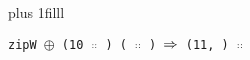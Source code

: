 \begin{frame}[fragile]

\vskip0pt plus 1filll

\begin{smathpar}
{
 \texttt{zipW $\oplus$ (10 {${\scriptstyle::}$} {\unk}) ({\unk} {${\scriptstyle::}$} {\unk}) $\Rightarrow$ (11, \unk) {${\scriptstyle::}$} {\unk}}
}
\end{smathpar}
\end{frame}
